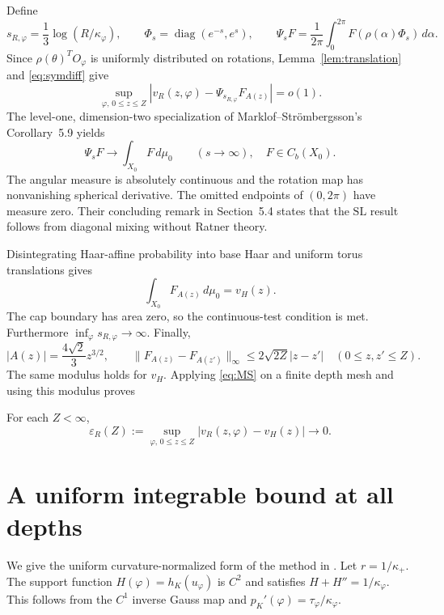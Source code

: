 \documentclass[11pt,a4paper]{article}
\theoremstyle{remark}\newtheorem{remark}{Remark}
\numberwithin{equation}{section}
\begin{document}
Define
\[
 s_{R,\varphi}=\frac13\log(R/\kappa_\varphi),\qquad
 \Phi_s=\operatorname{diag}(e^{-s},e^s),\qquad
 \Psi_sF=\frac1{2\pi}\int_0^{2\pi}F(\rho(\alpha)\Phi_s)\,d\alpha.
\]
Since $\rho(\theta)^TO_\varphi$ is uniformly distributed on rotations, Lemma~\ref{lem:translation} and \eqref{eq:symdiff} give
\begin{equation}\label{eq:capreduce}
 \sup_{\varphi,\,0\le z\le Z}
 |v_R(z,\varphi)-\Psi_{s_{R,\varphi}}F_{A(z)}|=o(1).
\end{equation}
The level-one, dimension-two specialization of Marklof--Strömbergsson's Corollary~5.9 \cite{MS} yields
\begin{equation}\label{eq:MS}
 \Psi_sF\longrightarrow\int_{X_0}F\,d\mu_0\qquad(s\to\infty),\quad F\in C_b(X_0).
\end{equation}
The angular measure is absolutely continuous and the rotation map has nonvanishing spherical derivative. The omitted endpoints of $(0,2\pi)$ have measure zero. Their concluding remark in Section~5.4 states that the $\mathrm{SL}$ result follows from diagonal mixing without Ratner theory.

Disintegrating Haar-affine probability into base Haar and uniform torus translations gives
\[
 \int_{X_0}F_{A(z)}\,d\mu_0=v_H(z).
\]
The cap boundary has area zero, so the continuous-test condition is met. Furthermore $\inf_\varphi s_{R,\varphi}\to\infty$. Finally,
\[
 |A(z)|=\frac{4\sqrt2}{3}z^{3/2},\qquad
 \|F_{A(z)}-F_{A(z')}\|_\infty\le2\sqrt{2Z}|z-z'|\quad(0\le z,z'\le Z).
\]
The same modulus holds for $v_H$. Applying \eqref{eq:MS} on a finite depth mesh and using this modulus proves
\begin{proposition}\label{prop:cv}
For each $Z<\infty$,
\begin{equation}\label{eq:cv}
 \varepsilon_R(Z):=\sup_{\varphi,\,0\le z\le Z}|v_R(z,\varphi)-v_H(z)|\longrightarrow0.
\end{equation}
\end{proposition}

\section{A uniform integrable bound at all depths}\label{sec:qu}
We give the uniform curvature-normalized form of the method in \cite[Theorem~5.1]{NR}. Let $r=1/\kappa_+$. The support function $H(\varphi)=h_K(u_\varphi)$ is $C^2$ and satisfies $H+H''=1/\kappa_\varphi$. This follows from the $C^1$ inverse Gauss map and $p_K'(\varphi)=\tau_\varphi/\kappa_\varphi$.
\end{document}
